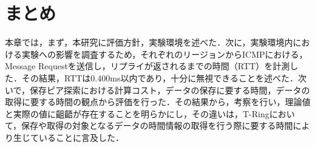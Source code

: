 %

\section{まとめ}
本章では，まず，本研究に評価方針，実験環境を述べた．次に，実験環境内における実験への影響を調査するため，それぞれのリージョンからICMPにおける，Message Requestを送信し，リプライが返されるまでの時間（RTT）を計測した．その結果，RTTは0.400ms以内であり，十分に無視できることを述べた．次いで，保存ピア探索における計算コスト，データの保存に要する時間，データの取得に要する時間の観点から評価を行った．その結果から，考察を行い，理論値と実際の値に齟齬が存在することを明らかにし，その違いは，T-Ringにおいて，保存や取得の対象となるデータの時間情報の取得を行う際に要する時間により生じていることに言及した．
